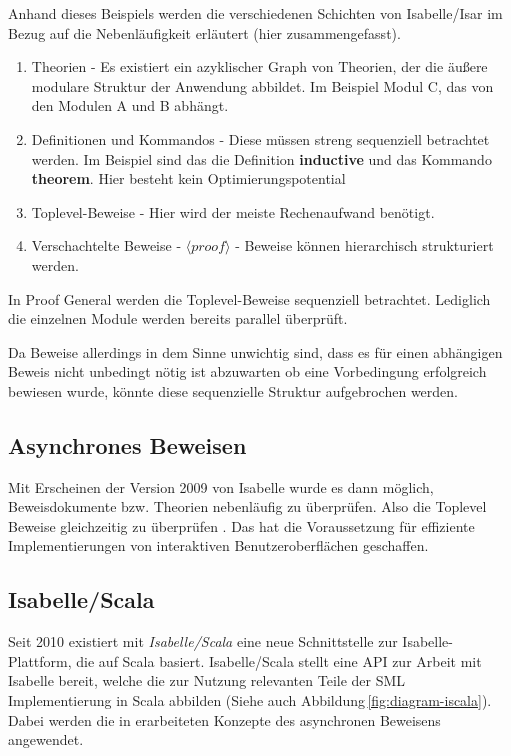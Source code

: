 Anhand dieses Beispiels werden die verschiedenen Schichten von Isabelle/Isar im Bezug auf die
Nebenläufigkeit erläutert (hier zusammengefasst).

\begin{enumerate}
  \item Theorien - Es existiert ein azyklischer Graph von Theorien, der die äußere modulare Struktur
  der Anwendung abbildet. Im Beispiel Modul C, das von den Modulen A und B abhängt. 

  \item Definitionen und Kommandos -   Diese müssen streng sequenziell betrachtet werden. Im
  Beispiel sind   das die Definition   \textbf{inductive} und das Kommando \textbf{theorem}. Hier
  besteht kein Optimierungspotential

  \item Toplevel-Beweise - Hier wird der meiste Rechenaufwand benötigt.

  \item Verschachtelte Beweise - $\langle proof\rangle$ - Beweise können hierarchisch strukturiert
  werden.  \end{enumerate}

In Proof General werden die Toplevel-Beweise sequenziell betrachtet. Lediglich die einzelnen Module
werden bereits parallel überprüft.

Da Beweise allerdings in dem Sinne unwichtig sind, dass es für einen abhängigen Beweis nicht
unbedingt nötig ist abzuwarten ob eine Vorbedingung erfolgreich bewiesen wurde, könnte diese
sequenzielle Struktur aufgebrochen werden.

\subsection{Asynchrones Beweisen}

Mit Erscheinen der Version 2009 von Isabelle wurde es dann möglich, Beweisdokumente bzw. Theorien
nebenläufig zu überprüfen. Also die Toplevel Beweise gleichzeitig zu überprüfen \cite{parproof}. Das
hat die Voraussetzung für effiziente Implementierungen von interaktiven Benutzeroberflächen
geschaffen.

\subsection{Isabelle/Scala}

Seit 2010 existiert mit \textit{Isabelle/Scala} eine neue Schnittstelle zur Isabelle-Plattform, die
auf Scala basiert. Isabelle/Scala stellt eine API zur Arbeit mit Isabelle bereit, welche die zur
Nutzung relevanten Teile der SML Implementierung in Scala abbilden \cite{iscala} (Siehe auch
Abbildung\,\ref{fig:diagram-iscala}). Dabei werden die in \cite{parproof} erarbeiteten Konzepte des
asynchronen Beweisens angewendet.

